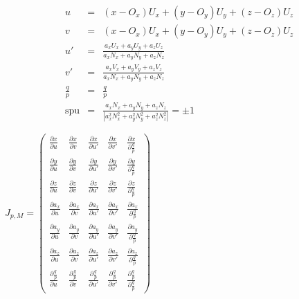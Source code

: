 \documentclass{article}
\begin{document}
\begin{eqnarray*}u & = & \left(x-O_{x}\right)U_{x}+\left(y-O_{y}\right)U_{y}+\left(z-O_{z}\right)U_{z}\\v & = & \left(x-O_{x}\right)U_{x}+\left(y-O_{y}\right)U_{y}+\left(z-O_{z}\right)U_{z}\\u\prime & = & \frac{a_{x}U_{x}+a_{y}U_{y}+a_{z}U_{z}}{a_{x}N_{x}+a_{y}N_{y}+a_{z}N_{z}}\\v\prime & = & \frac{a_{x}V_{x}+a_{y}V_{y}+a_{z}V_{z}}{a_{x}N_{x}+a_{y}N_{y}+a_{z}N_{z}}\\\frac{q}{p} & = & \frac{q}{p}\\\mbox{spu} & = & \frac{a_{x}N_{x}+a_{y}N_{y}+a_{z}N_{z}}{|a_{x}^{2}N_{x}^{2}+a_{y}^{2}N_{y}^{2}+a_{z}^{2}N_{z}^{2}|}=\pm1\end{eqnarray*}
\pagebreak

$J_{p,M}=\left(\begin{array}{ccccc}\frac{\partial x}{\partial u} & \frac{\partial x}{\partial v} & \frac{\partial x}{\partial u\prime} & \frac{\partial x}{\partial v\prime} & \frac{\partial x}{\partial\frac{q}{p}}\\\frac{\partial y}{\partial u} & \frac{\partial y}{\partial v} & \frac{\partial y}{\partial u\prime} & \frac{\partial y}{\partial v\prime} & \frac{\partial y}{\partial\frac{q}{p}}\\\frac{\partial z}{\partial u} & \frac{\partial z}{\partial v} & \frac{\partial z}{\partial u\prime} & \frac{\partial z}{\partial v\prime} & \frac{\partial z}{\partial\frac{q}{p}}\\\frac{\partial a_{x}}{\partial u} & \frac{\partial a_{x}}{\partial v} & \frac{\partial a_{x}}{\partial u\prime} & \frac{\partial a_{x}}{\partial v\prime} & \frac{\partial a_{x}}{\partial\frac{q}{p}}\\\frac{\partial a_{y}}{\partial u} & \frac{\partial a_{y}}{\partial v} & \frac{\partial a_{y}}{\partial u\prime} & \frac{\partial a_{y}}{\partial v\prime} & \frac{\partial a_{y}}{\partial\frac{q}{p}}\\\frac{\partial a_{z}}{\partial u} & \frac{\partial a_{z}}{\partial v} & \frac{\partial a_{z}}{\partial u\prime} & \frac{\partial a_{z}}{\partial v\prime} & \frac{\partial a_{z}}{\partial\frac{q}{p}}\\\frac{\partial\frac{q}{p}}{\partial u} & \frac{\partial\frac{q}{p}}{\partial v} & \frac{\partial\frac{q}{p}}{\partial u\prime} & \frac{\partial\frac{q}{p}}{\partial v\prime} & \frac{\partial\frac{q}{p}}{\partial\frac{q}{p}}\end{array}\right)$
\pagebreak
\end{document}
